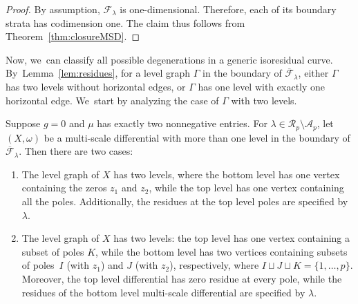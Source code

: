 \begin{proof}
By assumption, $\mathcal F_{\lambda}$ is one-dimensional. Therefore, each of its boundary strata has codimension one. The claim thus follows from Theorem~\ref{thm:closureMSD}.
\end{proof}

Now, we~can classify all possible degenerations in a generic isoresidual curve. By~Lemma~\ref{lem:residues}, for a level graph $\Gamma$ in the boundary of $\overline{\mathcal F}_\lambda$, either $\Gamma$ has two levels without horizontal edges, or $\Gamma$ has one level with exactly one horizontal edge. We~start by analyzing the case of $\Gamma$ with two levels.
\begin{prop}
\label{prop:F-boundary}
Suppose $g=0$ and $\mu$ has exactly two nonnegative entries.
For $\lambda \in \mathcal{R}_{p} \setminus \mathcal{A}_{p}$,
let $(X,\omega)$ be a multi-scale differential with more than one level in the boundary of $\overline{\mathcal F}_\lambda$. Then there are two cases:
\begin{enumerate}
\item\label{prop:F-boundary1}
The level graph of $X$ has two levels, where the bottom level has one vertex containing the zeros $z_1$ and $z_2$, while the top level has one vertex containing all the poles. Additionally, the residues at the top level poles are specified by $\lambda$.

\item\label{prop:F-boundary2}
The level graph of $X$ has two levels: the top level has one vertex containing a subset of poles $K$, while the bottom level has two vertices containing subsets of poles~$I$ (with $z_1$) and $J$ (with $z_2$), respectively, where $I\sqcup J \sqcup K = \{1, \ldots, p\}$. Moreover, the top level differential has zero residue at every pole, while the residues of the bottom level multi-scale differential are specified by $\lambda$.
\end{enumerate}
\end{prop}

